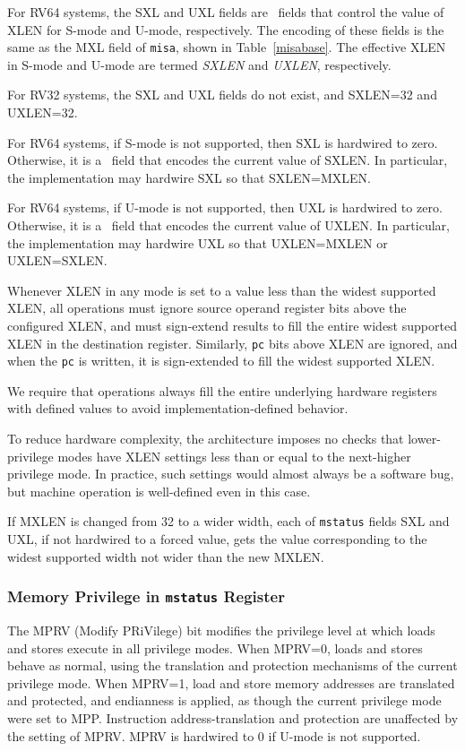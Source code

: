 For RV64 systems, the SXL and UXL fields are \warl\ fields
that control the value of XLEN for S-mode and U-mode,
respectively. The encoding of these fields is the same as the MXL
field of {\tt misa}, shown in Table~\ref{misabase}.  The effective
XLEN in S-mode and U-mode are termed {\em SXLEN} and {\em UXLEN},
respectively.

For RV32 systems, the SXL and UXL fields do not exist, and
SXLEN=32 and UXLEN=32.

For RV64 systems, if S-mode is not supported, then SXL is hardwired
to zero.  Otherwise, it is a \warl\ field that encodes the current value of
SXLEN.  In particular, the implementation may hardwire SXL so that
SXLEN=MXLEN.

For RV64 systems, if U-mode is not supported, then UXL is hardwired
to zero.  Otherwise, it is a \warl\ field that encodes the current value of
UXLEN.  In particular, the implementation may hardwire UXL so that
UXLEN=MXLEN or UXLEN=SXLEN.

Whenever XLEN in any mode is set to a value less than the widest
supported XLEN, all operations must ignore source operand register
bits above the configured XLEN, and must sign-extend results to fill
the entire widest supported XLEN in the destination register.
Similarly, {\tt pc} bits above XLEN are ignored, and when the {\tt pc}
is written, it is sign-extended to fill the widest supported XLEN.
\begin{commentary}
We require that operations always fill the entire underlying hardware
registers with defined values to avoid implementation-defined
behavior.

To reduce hardware complexity, the architecture imposes no checks that
lower-privilege modes have XLEN settings less than or equal to the
next-higher privilege mode.  In practice, such settings would almost
always be a software bug, but machine operation is well-defined even in this
case.
\end{commentary}

If MXLEN is changed from 32 to a wider width, each of {\tt mstatus} fields SXL and
UXL, if not hardwired to a forced value, gets the value corresponding to the
widest supported width not wider than the new MXLEN.

\subsubsection{Memory Privilege in {\tt mstatus} Register}

The MPRV (Modify PRiVilege) bit modifies the privilege level at which loads
and stores execute in all privilege modes.  When MPRV=0, loads and stores
behave as normal, using the translation and protection mechanisms of the
current privilege mode.
When MPRV=1, load and store memory addresses are translated and protected, and
endianness is applied, as though the current privilege mode were set to MPP.
Instruction address-translation and protection are unaffected by the setting
of MPRV.  MPRV is hardwired to 0 if U-mode is not supported.

